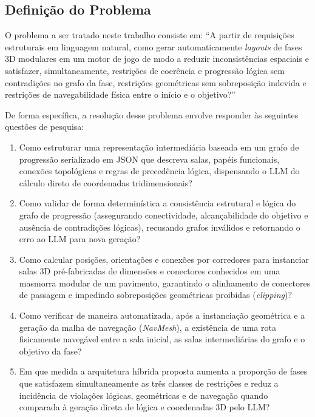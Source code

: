 \subsection{Definição do Problema}
\label{sec:definicao_problema}

O problema a ser tratado neste trabalho consiste em: ``A partir de requisições estruturais em linguagem natural, como gerar automaticamente \textit{layouts} de fases 3D modulares em um motor de jogo de modo a reduzir inconsistências espaciais e satisfazer, simultaneamente, restrições de coerência e progressão lógica sem contradições no grafo da fase, restrições geométricas sem sobreposição indevida e restrições de navegabilidade física entre o início e o objetivo?''

De forma específica, a resolução desse problema envolve responder às seguintes questões de pesquisa:

\begin{enumerate}
    \item Como estruturar uma representação intermediária baseada em um grafo de progressão serializado em JSON que descreva salas, papéis funcionais, conexões topológicas e regras de precedência lógica, dispensando o LLM do cálculo direto de coordenadas tridimensionais?
    \item Como validar de forma determinística a consistência estrutural e lógica do grafo de progressão (assegurando conectividade, alcançabilidade do objetivo e ausência de contradições lógicas), recusando grafos inválidos e retornando o erro ao LLM para nova geração?
    \item Como calcular posições, orientações e conexões por corredores para instanciar salas 3D pré-fabricadas de dimensões e conectores conhecidos em uma masmorra modular de um pavimento, garantindo o alinhamento de conectores de passagem e impedindo sobreposições geométricas proibidas (\textit{clipping})?
    \item Como verificar de maneira automatizada, após a instanciação geométrica e a geração da malha de navegação (\textit{NavMesh}), a existência de uma rota fisicamente navegável entre a sala inicial, as salas intermediárias do grafo e o objetivo da fase?
    \item Em que medida a arquitetura híbrida proposta aumenta a proporção de fases que satisfazem simultaneamente as três classes de restrições e reduz a incidência de violações lógicas, geométricas e de navegação quando comparada à geração direta de lógica e coordenadas 3D pelo LLM?
\end{enumerate}

